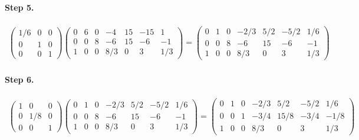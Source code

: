 \documentclass[11pt]{article}
\begin{document}
\paragraph{Step 5.}
\begin{eqnarray*}
\begin{pmatrix}
	1/6 & 0 & 0 \\
	0 & 1 & 0 \\
	0 & 0 & 1
\end{pmatrix}
\left(\begin{array}{cccccc|c}  
	0 & 6 & 0 & -4 & 15 & -15 & 1\\
    0 & 0 & 8 & -6 & 15 & -6 & -1\\
    1 & 0 & 0 & 8/3 & 0 & 3 & 1/3
\end{array}\right)
=
\left(\begin{array}{cccccc|c}  
	0 & 1 & 0 & -2/3 & 5/2 & -5/2 & 1/6\\
    0 & 0 & 8 & -6 & 15 & -6 & -1\\
    1 & 0 & 0 & 8/3 & 0 & 3 & 1/3
\end{array}\right)
\end{eqnarray*}

\paragraph{Step 6.}
\begin{eqnarray*}
\begin{pmatrix}
	1 & 0 & 0 \\
	0 & 1/8 & 0 \\
	0 & 0 & 1
\end{pmatrix}
\left(\begin{array}{cccccc|c}  
	0 & 1 & 0 & -2/3 & 5/2 & -5/2 & 1/6\\
    0 & 0 & 8 & -6 & 15 & -6 & -1\\
    1 & 0 & 0 & 8/3 & 0 & 3 & 1/3
\end{array}\right)
=
\left(\begin{array}{cccccc|c}  
	0 & 1 & 0 & -2/3 & 5/2 & -5/2 & 1/6\\
    0 & 0 & 1 & -3/4 & 15/8 & -3/4 & -1/8\\
    1 & 0 & 0 & 8/3 & 0 & 3 & 1/3
\end{array}\right)
\end{eqnarray*}
\end{document}
